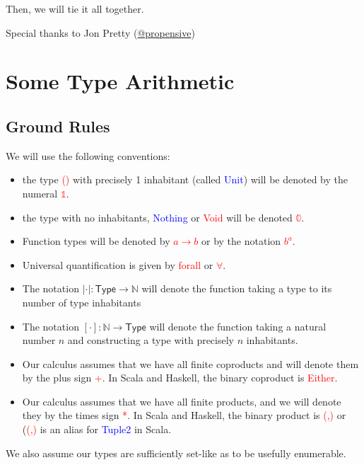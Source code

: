 \documentclass[tikz]{beamer}
\newcommand{\cat}[1]{\bm{ \mathsf{#1} }}
\newcommand{\zero}{\bm{\mathbb{0}}}
\newcommand{\one}{\bm{\mathbb{1}}}
\newcommand{\red}[1]{\textcolor{red}{#1}}
\newcommand{\mred}[1]{\textcolor{red}{$#1$}}
\newcommand{\blue}[1]{\textcolor{blue}{#1}}
\theoremstyle{definition}
\begin{document}
\frame
{ 
	Then, we will tie it all together. 
}

\frame
{ 
	Special thanks to Jon Pretty (\href{https://twitter.com/propensive}{@propensive})
}

\section{Some Type Arithmetic}

\subsection{Ground Rules}


\frame
{ 
	We will use the following conventions: 
	
	\begin{itemize}
		\item the type \red{()} with precisely 1 inhabitant (called \blue{Unit}) will be denoted by the numeral  \mred{\one}. 
		\item the type with no inhabitants, \blue{Nothing} or \red{Void} will be denoted \mred{\zero}. 
		\item Function types will be denoted by \red{$a \to b$} or by the notation \red{$b^a$}. 
		\item Universal quantification is given by \red{forall} or \red{$\forall$}.
		\item The notation $|\cdot| : \cat{Type} \to \mathbb{N}$ will denote the function taking a type to its number of type inhabitants
		\item The notation $[\cdot] : \mathbb{N} \to \cat{Type} $ will denote the function taking a natural number $n$ and constructing a type with precisely $n$ inhabitants. 
	\end{itemize}
}

\frame
{
	\begin{itemize}
		\item Our calculus assumes that we have all finite coproducts and will denote them by the plus sign \red{+}. In Scala and Haskell, the binary coproduct is \red{Either}.
		\item Our calculus assumes that we have all finite products, and we will denote they by the times sign \red{*}. In Scala and Haskell, the binary product is \red{(,)} or (\red{(,)} is an alias for \blue{Tuple2} in Scala.
	\end{itemize}
}


\frame
{
	We also assume our types are sufficiently set-like as to be usefully enumerable. 
}
\end{document}
